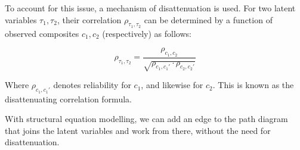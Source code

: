 \documentclass{article}
\begin{document}
\begin{multicols*}{2}
To account for this issue, a mechanism of disattenuation is used. For two latent variables $\tau_1,\tau_2$, their correlation $\rho_{\tau_1,\tau_2}$ can be determined by a function of observed composites $c_1, c_2$ (respectively) as follows:

\[\rho_{\tau_1,\tau_2} = \frac{\rho_{c_1, c_2}}{\sqrt{\rho_{c_1, c_1'} \cdot \rho_{c_2, c_2'}}}\]

Where $\rho_{c_1, c_1'}$ denotes reliability for $c_1$, and likewise for $c_2$. This is known as the disattenuating correlation formula.

With structural equation modelling, we can add an edge to the path diagram that joins the latent variables and work from there, without the need for disattenuation.
\end{multicols*}
\end{document}
